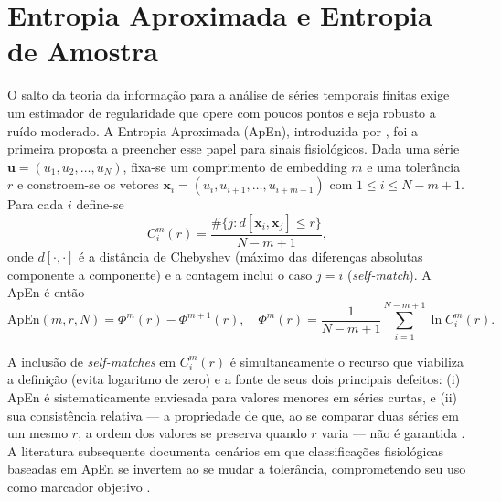 \section{Entropia Aproximada e Entropia de Amostra}
\label{sec:apen-sampen}

O salto da teoria da informação para a análise de séries temporais
finitas exige um estimador de regularidade que opere com poucos pontos
e seja robusto a ruído moderado. A Entropia Aproximada (ApEn),
introduzida por , foi a primeira proposta a
preencher esse papel para sinais fisiológicos. Dada uma série
$\mathbf{u} = (u_1, u_2, \ldots, u_N)$, fixa-se um comprimento de
embedding $m$ e uma tolerância $r$ e constroem-se os vetores
$\mathbf{x}_i = (u_i, u_{i+1}, \ldots, u_{i+m-1})$ com
$1 \le i \le N - m + 1$. Para cada $i$ define-se
\begin{equation}
  C_i^m(r) = \frac{\#\{j : d[\mathbf{x}_i, \mathbf{x}_j] \le r\}}
                  {N - m + 1},
  \label{eq:apen-ci}
\end{equation}
onde $d[\cdot, \cdot]$ é a distância de Chebyshev (máximo das
diferenças absolutas componente a componente) e a contagem inclui o
caso $j = i$ (\emph{self-match}). A ApEn é então
\begin{equation}
  \mathrm{ApEn}(m, r, N) = \Phi^m(r) - \Phi^{m+1}(r),
  \quad
  \Phi^m(r) = \frac{1}{N - m + 1}\sum_{i=1}^{N-m+1} \ln C_i^m(r).
  \label{eq:apen}
\end{equation}

A inclusão de \emph{self-matches} em $C_i^m(r)$ é simultaneamente o
recurso que viabiliza a definição (evita logaritmo de zero) e a fonte
de seus dois principais defeitos: (i) ApEn é sistematicamente
enviesada para valores menores em séries curtas, e (ii) sua
consistência relativa --- a propriedade de que, ao se comparar duas
séries em um mesmo $r$, a ordem dos valores se preserva quando $r$
varia --- não é garantida \cite{richman2000,delgadobonal2019}. A
literatura subsequente documenta cenários em que classificações
fisiológicas baseadas em ApEn se invertem ao se mudar a tolerância,
comprometendo seu uso como marcador objetivo
\cite{yentes2013,delgadobonal2019}.

